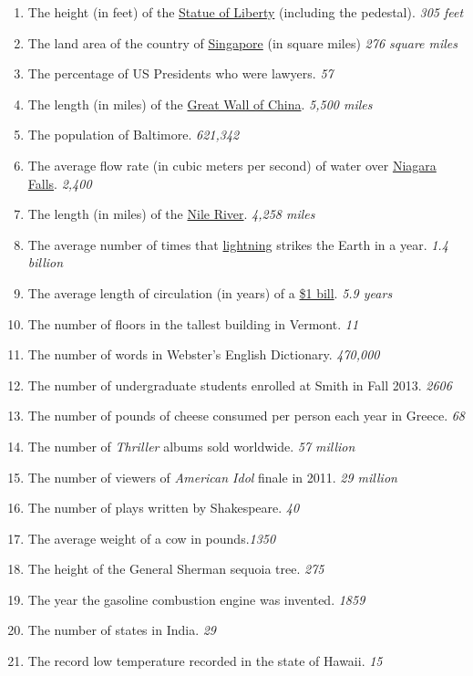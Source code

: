 \documentclass[10pt]{article}\usepackage[]{graphicx}\usepackage[]{color}
\begin{document}
\begin{enumerate}
  \item The height (in feet) of the \href{http://en.wikipedia.org/wiki/Statue_of_liberty#Physical_characteristics}{Statue of Liberty} (including the pedestal). \emph{305 feet}
  \item The land area of the country of \href{http://en.wikipedia.org/wiki/Singapore}{Singapore} (in square miles) \emph{276 square miles}
  \item The percentage of US Presidents who were lawyers. \emph{57}
  \item The length (in miles) of the \href{http://en.wikipedia.org/wiki/Great_Wall_of_China}{Great Wall of China}. \emph{5,500 miles}
  \item The population of Baltimore. \emph{621,342}
  \item The average flow rate (in cubic meters per second) of water over \href{http://en.wikipedia.org/wiki/Niagara_Falls}{Niagara Falls}.
\emph{2,400}
  \item The length (in miles) of the \href{http://en.wikipedia.org/wiki/Nile_river}{Nile River}. \emph{4,258 miles}
  \item The average number of times that \href{http://en.wikipedia.org/wiki/Bolt_of_lightning#General_considerations}{lightning} strikes the Earth in a year. \emph{1.4 billion}
  \item The average length of circulation (in years) of a \href{http://en.wikipedia.org/wiki/United_States_one-dollar_bill}{\$1 bill}. \emph{5.9 years}
  \item The number of floors in the tallest building in Vermont. \emph{11}
  \item The number of words in Webster's English Dictionary. \emph{470,000}
  \item The number of undergraduate students enrolled at Smith in Fall 2013. \emph{2606}
  \item The number of pounds of cheese consumed per person each year in Greece. \emph{68}
  \item The number of \emph{Thriller} albums sold worldwide. \emph{57 million}
  \item The number of viewers of \emph{American Idol} finale in 2011.  \emph{29 million}
  \item The number of plays written by Shakespeare. \emph{40}
  \item The average weight of a cow in pounds.\emph{1350}
  \item The height of the General Sherman sequoia tree. \emph{275}
  \item The year the gasoline combustion engine was invented. \emph{1859}
  \item The number of states in India. \emph{29}
  \item The record low temperature recorded in the state of Hawaii. \emph{15}
  
\end{enumerate}
\end{document}

